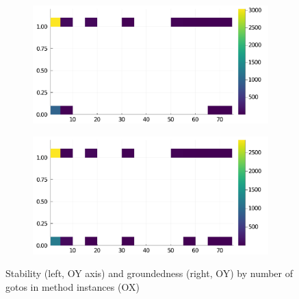 \begin{figure}[h]
     \begin{subfigure}[b]{0.49\textwidth}
       \includegraphics[width=\textwidth]{figs/all-package-graphs/Flux-gotos-vs-stable.pdf}
     \end{subfigure}
     \begin{subfigure}[b]{0.49\textwidth}
       \includegraphics[width=\textwidth]{figs/all-package-graphs/Flux-gotos-vs-grounded.pdf}
     \end{subfigure}
\caption{Stability (left, OY axis) and groundedness (right, OY) by number of gotos in method instances (OX)}%
%
\label{figs:gotos:Flux}
\end{figure}

